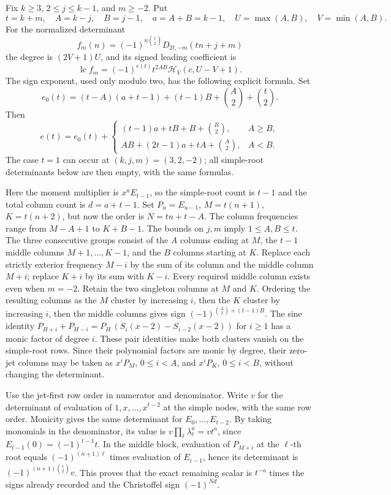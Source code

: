 \documentclass[11pt,a4paper]{article}
\begin{document}
Fix $k\ge3$, $2\le j\le k-1$, and $m\ge-2$. Put
\[
 t=k+m,\quad A=k-j,\quad B=j-1,\quad a=A+B=k-1,\quad
 U=\max(A,B),\quad V=\min(A,B).
\]
For the normalized determinant
\[
 f_m(n)=(-1)^{n\binom t2}D_{2t,-m}(tn+j+m)
\]
the degree is $(2V+1)U$, and its signed leading coefficient is
\[
 \operatorname{lc} f_m=(-1)^{e(t)}t^{2AB}\mathcal H_V(c,U-V+1).
 \tag{E1}
\]
The sign exponent, used only modulo two, has the following explicit formula. Set
\[
 e_0(t)=(t-A)(a+t-1)+(t-1)B+\binom A2+\binom t2.
\]
Then
\[
 e(t)=e_0(t)+
 \begin{cases}
 (t-1)a+t B+B+\binom B2,&A\ge B,\\
 AB+(2t-1)a+t A+\binom A2,&A<B.
 \end{cases}
 \tag{E2}
\]
The case $t=1$ can occur at $(k,j,m)=(3,2,-2)$; all simple-root determinants below are then empty, with the same formulas.

Here the moment multiplier is $x^aE_{t-1}$, so the simple-root count is $t-1$ and the total column count is $d=a+t-1$. Set $P_u=E_{u-1}$, $M=t(n+1)$, $K=t(n+2)$, but now the order is $N=tn+t-A$. The column frequencies range from $M-A+1$ to $K+B-1$. The bounds on $j,m$ imply $1\le A,B\le t$. The three consecutive groups consist of the $A$ columns ending at $M$, the $t-1$ middle columns $M+1,\ldots,K-1$, and the $B$ columns starting at $K$. Replace each strictly exterior frequency $M-i$ by the sum of its column and the middle column $M+i$; replace $K+i$ by its sum with $K-i$. Every required middle column exists even when $m=-2$. Retain the two singleton columns at $M$ and $K$. Ordering the resulting columns as the $M$ cluster by increasing $i$, then the $K$ cluster by increasing $i$, then the middle columns gives sign $(-1)^{\binom A2+(t-1)B}$. The sine identity $P_{H+i}+P_{H-i}=P_H\,(S_i(x-2)-S_{i-2}(x-2))$ for $i\ge1$ has a monic factor of degree $i$. These pair identities make both clusters vanish on the simple-root rows. Since their polynomial factors are monic by degree, their zero-jet columns may be taken as $x^iP_M$, $0\le i<A$, and $x^iP_K$, $0\le i<B$, without changing the determinant.

Use the jet-first row order in numerator and denominator. Write $v$ for the determinant of evaluation of $1,x,\ldots,x^{t-2}$ at the simple nodes, with the same row order. Monicity gives the same determinant for $E_0,\ldots,E_{t-2}$. By taking monomials in the denominator, its value is $v\prod_{\ell}\lambda_\ell^a=v t^a$, since $E_{t-1}(0)=(-1)^{t-1}t$. In the middle block, evaluation of $P_{M+i}$ at the $\ell$-th root equals $(-1)^{(n+1)\ell}$ times evaluation of $E_{i-1}$, hence its determinant is $(-1)^{(n+1)\binom t2}v$. This proves that the exact remaining scalar is $t^{-a}$ times the signs already recorded and the Christoffel sign $(-1)^{Nd}$.
\end{document}
